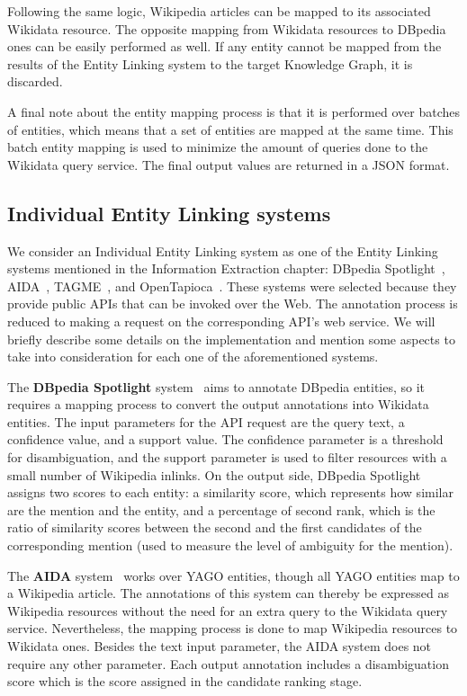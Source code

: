 Following the same logic, Wikipedia articles can be mapped to its associated Wikidata resource. 
The opposite mapping from Wikidata resources to DBpedia ones can be easily performed as well. 
If any entity cannot be mapped from the results of the Entity Linking system to the target 
Knowledge Graph, it is discarded.

A final note about the entity mapping process is that it is performed over batches of entities, 
which means that a set of entities are mapped at the same time. This batch entity mapping is 
used to minimize the amount of queries done to the Wikidata query service. The final output 
values are returned in a JSON format.

\subsection{Individual Entity Linking systems}
\label{cap3:system/entLinModule/individualSystems}
We consider an Individual Entity Linking system as one of the Entity Linking systems mentioned 
in the Information Extraction chapter: DBpedia Spotlight~\cite{EL:dbpedia-spotlight-MendesJGB11}, 
AIDA~\cite{EL:aida-tool-YosefHBSW11, EL:aida-HoffartYBFPSTTW11}, TAGME~\cite{EL:tagme-FerraginaS10}, 
and OpenTapioca~\cite{EL:opentapioca-Delpeuch19}. These systems were selected because they 
provide public APIs that can be invoked over the Web. The annotation process is reduced to 
making a request on the corresponding API’s web service. We will briefly describe some details 
on the implementation and mention some aspects to take into consideration for each one of the 
aforementioned systems.

The \textbf{DBpedia Spotlight} system~\cite{EL:dbpedia-spotlight-MendesJGB11} aims to 
annotate DBpedia entities, so it requires a mapping process to convert the output annotations 
into Wikidata entities. The input parameters for the API request are the query text, a 
confidence value, and a support value. The confidence parameter is a threshold for disambiguation, 
and the support parameter is used to filter resources with a small number of Wikipedia 
inlinks. On the output side, DBpedia Spotlight assigns two scores to each entity: a 
similarity score, which represents how similar are the mention and the entity, and a 
percentage of second rank, which is the ratio of similarity scores between the second and the 
first candidates of the corresponding mention (used to measure the level of ambiguity for the 
mention).

The \textbf{AIDA} system~\cite{EL:aida-tool-YosefHBSW11, EL:aida-HoffartYBFPSTTW11} works over 
YAGO entities, though all YAGO entities map to a Wikipedia article. The annotations of this 
system can thereby be expressed as Wikipedia resources without the need for an extra query to 
the Wikidata query service. Nevertheless, the mapping process is done to map Wikipedia resources 
to Wikidata ones. Besides the text input parameter, the AIDA system does not require any other 
parameter. Each output annotation includes a disambiguation score which is the score assigned 
in the candidate ranking stage.

